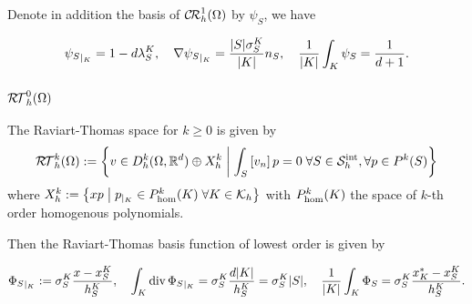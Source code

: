 Denote in addition the basis of $\mathcal{C\!R}^1_h(\Omega)$ by $\psi_S$, we have
%
\begin{yellow}
\begin{equation}\label{eq:}
{\psi_S}_{|_{K}} = 1- d \lambda_S^K, \quad \nabla {\psi_S}_{|_{K}} =
\frac{|S|\sigma_{S}^K}{|K|}n_S,\quad \frac{1}{|K|}\int_K \psi_S = \frac{1}{d+1}.
\end{equation}
\end{yellow}%
%


%
\subsubsection{$\mathcal{R\!T}^0_h(\Omega)$}
%

The Raviart-Thomas space for $k\ge0$ is given by
%
\begin{equation}\label{eq:}
\mathcal{R\!T}^k_h(\Omega):= \left\{v\in D^k_h(\Omega,\mathbb R^d)\oplus X^k_h\;\middle|\;\int_S\left[v_n\right]p=0\;\forall S\in\mathcal S^{\rm int}_h,\forall p\in P^{k}(S)\right\}
\end{equation}
%
where $X^k_h:=\left\{xp\;\middle|\;{p}_{|_{K}}\in P_{\rm hom}^{k}(K)\; \forall K\in\mathcal K_h\right\}$ with $P_{\rm hom}^{k}(K)$ the space of $k$-th order homogenous polynomials.

Then the Raviart-Thomas basis function of lowest order is given by
%
\begin{yellow}
\begin{equation}\label{eq:BasisFctRt}
{\Phi_S}_{|_{K}} := \sigma_{S}^K \frac{x-x_S^K}{h_S^K},\quad 
\int_K \operatorname{div} {\Phi_S}_{|_{K}} = \sigma_{S}^K \frac{d|K|}{h_S^K}=  \sigma_{S}^K|S|,\quad \frac{1}{|K|}\int_K \Phi_S = \sigma_{S}^K\frac{x_K^* - x_S^K}{h_S^K}.
\end{equation}
\end{yellow}%

%

\printbibliography[title=References Section~\thesection]

